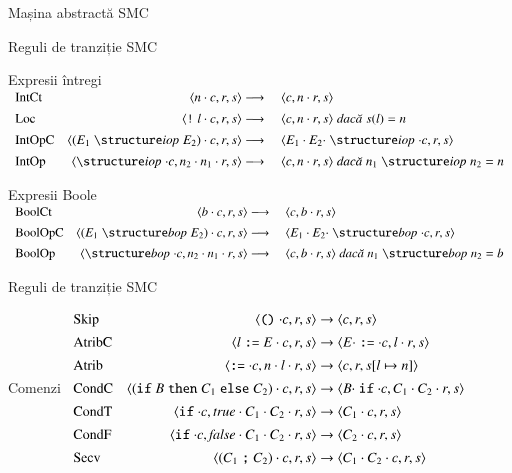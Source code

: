 \documentclass[handout,xcolor=pdftex,romanian,colorlinks]{beamer}
\begin{document}
\begin{section}{Mașina abstractă SMC}
\begin{frame}{Reguli de tranziție SMC}{}
\begin{block}{Expresii întregi}
$\begin{array}{l@{\extracolsep{1em}}r@{{}\longrightarrow{}}l}
\mbox{IntCt}&
\c{n\cdot c,r,s} & \c{c, n \cdot r, s}
\\[1ex]
\mbox{Loc}&
\c{\terminal{!} l\cdot c,r,s} & \c{c, n \cdot r, s}  \Sdaca s(l) = n
\\[1ex]
\mbox{IntOpC}&
\c{(E_1 \iop E_2) \cdot c, r, s} & \c{E_1 \cdot E_2 \cdot \iop \cdot c, r, s}
\\[1ex]
\mbox{IntOp}&
\c{\iop \cdot c, n_2\cdot n_1 \cdot r, s} & \c{c, n \cdot r, s} \Sdaca n_1 \iop n_2 = n
\end{array}$
\end{block}
\begin{block}{Expresii Boole}
$\begin{array}{l@{\extracolsep{1em}}r@{{}\longrightarrow{}}l}
\mbox{BoolCt}&
\c{b\cdot c,r,s} & \c{c, b \cdot r, s}
\\[1ex]
\mbox{BoolOpC}&
\c{(E_1 \bop E_2) \cdot c, r, s} & \c{E_1 \cdot E_2 \cdot \bop \cdot c, r, s}
\\[1ex]
\mbox{BoolOp}&
\c{\bop \cdot c, n_2\cdot n_1 \cdot r, s} & \c{c, b \cdot r, s} \Sdaca n_1 \bop n_2 = b
\end{array}$
\end{block}
\end{frame}

\begin{frame}{Reguli de tranziție SMC}{}
\begin{block}{Comenzi}
$\begin{array}{lr@{{}\rightarrow{}}l}
\mbox{Skip}&
\c{\Sskip \cdot c,r,s} & \c{c, r, s}
\\[1ex]
\mbox{AtribC}&
\c{l \terminal{:=} E \cdot c,r,s} & \c{E \cdot \terminal{:=} \cdot c, l \cdot r, s} 
\\[1ex]
\mbox{Atrib}&
\c{\terminal{:=}\cdot c,n \cdot l\cdot r,s} & \c{c, r, s[l\mapsto n]} 
\\[1ex]
\mbox{CondC}&
\c{(\Sif B \Sthen C_1 \Selse C_2) \cdot c, r, s} & \c{B \cdot \Sif \cdot c, C_1 \cdot C_2 \cdot r, s}
\\[1ex]
\mbox{CondT}&
\c{\Sif \cdot c, \Strue \cdot C_1 \cdot C_2 \cdot r, s} & \c{C_1 \cdot c, r, s}
\\[1ex]
\mbox{CondF}&
\c{\Sif \cdot c, \Sfalse \cdot C_1 \cdot C_2 \cdot r, s} & \c{C_2 \cdot c, r, s}
\\[1ex]
\mbox{Secv}&
\c{(C_1 \terminal{;} C_2) \cdot c, r, s} & \c{C_1 \cdot C_2 \cdot c, r, s}
\end{array}$
\end{block}
\end{frame}


\end{section}
\end{document}
